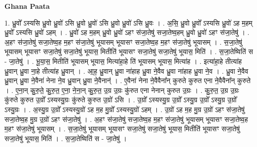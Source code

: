 \documentclass[17pt]{extarticle}
\begin{document}
\textbf{Ghana Paata } \newline

1. ध्रु॒वो᳚ ऽस्यसि ध्रु॒वो ध्रु॒वो॑ ऽसि ध्रु॒वो ध्रु॒वो॑ ऽसि ध्रु॒वो ध्रु॒वो॑ ऽसि ध्रु॒वः । . अ॒सि॒ ध्रु॒वो ध्रु॒वो᳚ ऽस्यसि ध्रु॒वो॑ ऽह म॒हम् ध्रु॒वो᳚ ऽस्यसि ध्रु॒वो॑ ऽहम् । . ध्रु॒वो॑ ऽह म॒हम् ध्रु॒वो ध्रु॒वो॑ ऽहꣳ स॑जा॒तेषु॑ सजा॒तेष्व॒हम् ध्रु॒वो ध्रु॒वो॑ ऽहꣳ स॑जा॒तेषु॑ । . अ॒हꣳ स॑जा॒तेषु॑ सजा॒तेष्व॒ह म॒हꣳ स॑जा॒तेषु॑ भूयासम् भूयासꣳ सजा॒तेष्व॒ह म॒हꣳ स॑जा॒तेषु॑ भूयासम् । . स॒जा॒तेषु॑ भूयासम् भूयासꣳ सजा॒तेषु॑ सजा॒तेषु॑ भूयास॒ मितीति॑ भूयासꣳ सजा॒तेषु॑ सजा॒तेषु॑ भूयास॒ मिति॑ । . स॒जा॒तेष्विति॑ स - जा॒तेषु॑ । . भू॒या॒स॒ मितीति॑ भूयासम् भूयास॒ मित्या॑हा॒हे ति॑ भूयासम् भूयास॒ मित्या॑ह । . इत्या॑हा॒हे तीत्या॑ह ध्रु॒वान् ध्रु॒वा ना॒हे तीत्या॑ह ध्रु॒वान् । . आ॒ह॒ ध्रु॒वान् ध्रु॒वा ना॑हाह ध्रु॒वा ने॒वैव ध्रु॒वा ना॑हाह ध्रु॒वा ने॒व । . ध्रु॒वा ने॒वैव ध्रु॒वान् ध्रु॒वा ने॒वैना॑ नेना ने॒व ध्रु॒वान् ध्रु॒वा ने॒वैनान्॑ । . ए॒वैना॑ नेना ने॒वैवैना᳚न् कुरुते कुरुत एना ने॒वैवैना᳚न् कुरुते । . ए॒ना॒न् कु॒रु॒ते॒ कु॒रु॒त॒ ए॒ना॒ ने॒ना॒न् कु॒रु॒त॒ उ॒ग्र उ॒ग्रः कु॑रुत एना नेनान् कुरुत उ॒ग्रः । . कु॒रु॒त॒ उ॒ग्र उ॒ग्रः कु॑रुते कुरुत उ॒ग्रो᳚ ऽस्यस्यु॒ग्रः कु॑रुते कुरुत उ॒ग्रो॑ ऽसि । . उ॒ग्रो᳚ ऽस्यस्यु॒ग्र उ॒ग्रो᳚ ऽस्यु॒ग्र उ॒ग्रो᳚ ऽस्यु॒ग्र उ॒ग्रो᳚ ऽस्यु॒ग्रः । . अ॒स्यु॒ग्र उ॒ग्रो᳚ ऽस्यस्यु॒ग्रो॑ ऽह म॒ह मु॒ग्रो᳚ ऽस्यस्यु॒ग्रो॑ ऽहम् । . उ॒ग्रो॑ ऽह म॒ह मु॒ग्र उ॒ग्रो॑ ऽहꣳ स॑जा॒तेषु॑ सजा॒तेष्व॒ह मु॒ग्र उ॒ग्रो॑ ऽहꣳ स॑जा॒तेषु॑ । . अ॒हꣳ स॑जा॒तेषु॑ सजा॒तेष्व॒ह म॒हꣳ स॑जा॒तेषु॑ भूयासम् भूयासꣳ सजा॒तेष्व॒ह म॒हꣳ स॑जा॒तेषु॑ भूयासम् । . स॒जा॒तेषु॑ भूयासम् भूयासꣳ सजा॒तेषु॑ सजा॒तेषु॑ भूयास॒ मितीति॑ भूयासꣳ सजा॒तेषु॑ सजा॒तेषु॑ भूयास॒ मिति॑ । . स॒जा॒तेष्विति॑ स - जा॒तेषु॑ । \newline
\end{document}
